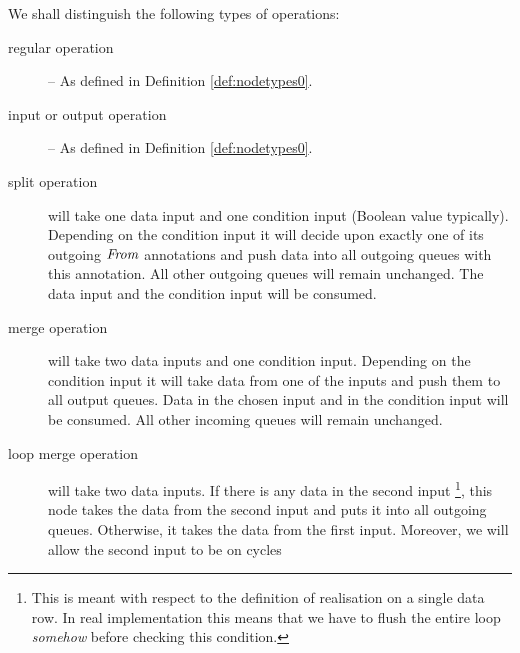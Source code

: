   We shall distinguish the following types of operations:
\begin{description}
\item [regular operation] -- As defined in Definition \ref{def:nodetypes0}.
\item [input or output operation] -- As defined in Definition \ref{def:nodetypes0}.
\item [split operation] will take one data input and one condition input (Boolean value typically). Depending on the condition input it will decide upon exactly one of its outgoing $\mf{from}$ annotations and push data into all outgoing queues with this annotation. All other outgoing queues will remain unchanged. The data input and the condition input will be consumed.
  \item [merge operation] will take two data inputs and one condition input. Depending on the condition input it will take data from one of the inputs and push them to all output queues. Data in the chosen input and in the condition input will be consumed. All other incoming queues will remain unchanged.

  \item [loop merge operation] will take two data inputs. If there is any data in the second input \footnote{This is meant with respect to the definition of realisation on a single data row. In real implementation this means that we have to flush the entire loop \emph{somehow} before checking this condition.}, this node takes the data from the second input and puts it into all outgoing queues. Otherwise, it takes the data from the first input. Moreover, we will allow the second input to be on cycles



\end{description}
